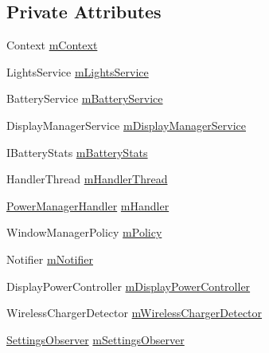 \subsection*{Private Attributes}
\begin{DoxyCompactItemize}
\item 
Context \hyperlink{classcom_1_1android_1_1server_1_1power_1_1PowerManagerService_af9124c559a6212ac027d1b51c5db72df}{m\-Context}
\item 
Lights\-Service \hyperlink{classcom_1_1android_1_1server_1_1power_1_1PowerManagerService_a6ce9c746f52b610e6a4c2aa92306e6b1}{m\-Lights\-Service}
\item 
Battery\-Service \hyperlink{classcom_1_1android_1_1server_1_1power_1_1PowerManagerService_aa731ac88de43815e2d5737b2f96e2b8e}{m\-Battery\-Service}
\item 
Display\-Manager\-Service \hyperlink{classcom_1_1android_1_1server_1_1power_1_1PowerManagerService_afb93a230a7ed013800071ced919d39a1}{m\-Display\-Manager\-Service}
\item 
I\-Battery\-Stats \hyperlink{classcom_1_1android_1_1server_1_1power_1_1PowerManagerService_ab462a504cf0394c7674da909a42ca2a3}{m\-Battery\-Stats}
\item 
Handler\-Thread \hyperlink{classcom_1_1android_1_1server_1_1power_1_1PowerManagerService_a4feebccdbcdb8d3005f3112686739204}{m\-Handler\-Thread}
\item 
\hyperlink{classcom_1_1android_1_1server_1_1power_1_1PowerManagerService_1_1PowerManagerHandler}{Power\-Manager\-Handler} \hyperlink{classcom_1_1android_1_1server_1_1power_1_1PowerManagerService_afc99eff54fb486133a393528dae56ee4}{m\-Handler}
\item 
Window\-Manager\-Policy \hyperlink{classcom_1_1android_1_1server_1_1power_1_1PowerManagerService_abf9ac285d38eaa92f88c609e5719bc54}{m\-Policy}
\item 
Notifier \hyperlink{classcom_1_1android_1_1server_1_1power_1_1PowerManagerService_aafa526c268bce540ab073a9a449e0a87}{m\-Notifier}
\item 
Display\-Power\-Controller \hyperlink{classcom_1_1android_1_1server_1_1power_1_1PowerManagerService_a8b30d5c6dbbaadbd935fd582f9024b96}{m\-Display\-Power\-Controller}
\item 
Wireless\-Charger\-Detector \hyperlink{classcom_1_1android_1_1server_1_1power_1_1PowerManagerService_a07ae6dc16ea444cf7d0b6dc393b49659}{m\-Wireless\-Charger\-Detector}
\item 
\hyperlink{classcom_1_1android_1_1server_1_1power_1_1PowerManagerService_1_1SettingsObserver}{Settings\-Observer} \hyperlink{classcom_1_1android_1_1server_1_1power_1_1PowerManagerService_afcadceca8d2c5e60e446f37e901d81dc}{m\-Settings\-Observer}

\end{DoxyCompactItemize}
